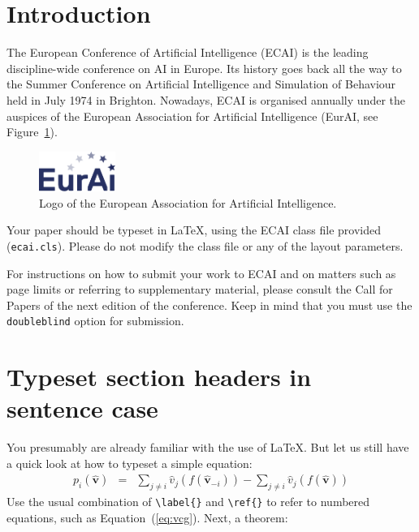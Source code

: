 \documentclass{ecai}
\begin{document}

\section{Introduction}

The European Conference of Artificial Intelligence (ECAI) is the leading 
discipline-wide conference on AI in Europe. Its history goes back all 
the way to the Summer Conference on Artificial Intelligence and 
Simulation of Behaviour held in July 1974 in Brighton. Nowadays, ECAI is 
organised annually under the auspices of the European Association for 
Artificial Intelligence (EurAI, see Figure~\ref{fig:eurai}).

\begin{figure}[h]
\centering
\includegraphics[width=2.5cm]{eurai}
\caption{Logo of the European Association for Artificial Intelligence.}
\label{fig:eurai}
\end{figure}

Your paper should be typeset in \LaTeX, using the ECAI class file 
provided (\texttt{ecai.cls}). Please do not modify the class file or any 
of the layout parameters.

For instructions on how to submit your work to ECAI and on matters such 
as page limits or referring to supplementary material, please consult 
the Call for Papers of the next edition of the conference. Keep in mind
that you must use the \texttt{doubleblind} option for submission.


\section{Typeset section headers in sentence case}

You presumably are already familiar with the use of \LaTeX. But let 
us still have a quick look at how to typeset a simple equation: 
%
\begin{eqnarray}\label{eq:vcg}
p_i(\boldsymbol{\hat{v}}) & = &
\sum_{j \neq i} \hat{v}_j(f(\boldsymbol{\hat{v}}_{-i})) - 
\sum_{j \neq i} \hat{v}_j(f(\boldsymbol{\hat{v}})) 
\end{eqnarray}
%
Use the usual combination of \verb|\label{}| and \verb|\ref{}| to 
refer to numbered equations, such as Equation~(\ref{eq:vcg}). 
Next, a theorem: 
\end{document}
